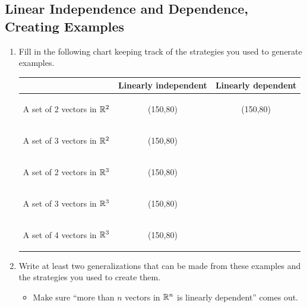 \documentclass{workbook}
\begin{document}
\begin{iola}
\begin{slide}
\section*{Linear Independence and Dependence, Creating Examples}
\question


\begin{enumerate}
	\item Fill in the following chart keeping track of the strategies you used to generate
examples.

\vspace{2mm}

\begin{center}
	\newcommand\emptybox{\begin{bookonly}\makebox(150,80){}\end{bookonly}}
\begin{tabular}{|c|c|c|}
	\hline
	&Linearly independent & Linearly dependent \\
	\hline
	A set of 2 vectors in $\mathbb{R}^2$ &\emptybox&\emptybox\\
	\hline
	A set of 3 vectors in $\mathbb{R}^2$ &\emptybox&\\
	\hline
	A set of 2 vectors in $\mathbb{R}^3$ &\emptybox&\\
	\hline
	A set of 3 vectors in $\mathbb{R}^3$ &\emptybox&\\
	\hline
	A set of 4 vectors in $\mathbb{R}^3$ &\emptybox&\\
	\hline
\end{tabular}
\end{center}

		\item Write at least two generalizations that can
			be made from these examples and the strategies you
			used to create them.
	\begin{annotation}
		\begin{notes}
			\begin{itemize}
				\item Make sure ``more than $n$ vectors in $\mathbb{R}^n$
					is linearly dependent'' comes out.
			\end{itemize}
		\end{notes}
	\end{annotation}

\end{enumerate}
\end{slide}
\end{iola}
\end{document}
